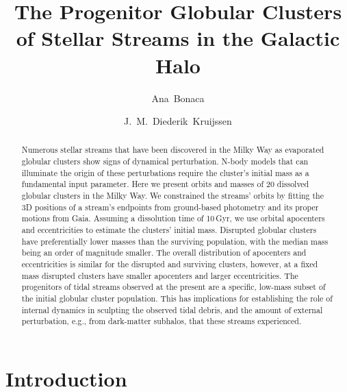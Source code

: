 \documentclass[twocolumn]{aastex63}
\begin{document}
\sloppy\sloppypar\raggedbottom\frenchspacing %

\title{The Progenitor Globular Clusters of Stellar Streams in the Galactic Halo}


\author[0000-0002-7846-9787]{Ana~Bonaca}

\author[0000-0002-8804-0212]{J.~M.~Diederik~Kruijssen}


\begin{abstract}\noindent %
Numerous stellar streams that have been discovered in the Milky Way as evaporated globular clusters show signs of dynamical perturbation.
N-body models that can illuminate the origin of these perturbations require the cluster's initial mass as a fundamental input parameter.
Here we present orbits and masses of 20 dissolved globular clusters in the Milky Way.
We constrained the streams' orbits by fitting the 3D positions of a stream's endpoints from ground-based photometry and its proper motions from Gaia.
Assuming a dissolution time of 10\,Gyr, we use orbital apocenters and eccentricities to estimate the clusters' initial mass.
Disrupted globular clusters have preferentially lower masses than the surviving population, with the median mass being an order of magnitude smaller.
The overall distribution of apocenters and eccentricities is similar for the disrupted and surviving clusters, however, at a fixed mass disrupted clusters have smaller apocenters and larger eccentricities.
The progenitors of tidal streams observed at the present are a specific, low-mass subset of the initial globular cluster population.
This has implications for establishing the role of internal dynamics in sculpting the observed tidal debris, and the amount of external perturbation, e.g., from dark-matter subhalos, that these streams experienced.
\end{abstract}

\section{Introduction}
\label{sec:intro}
\end{document}

